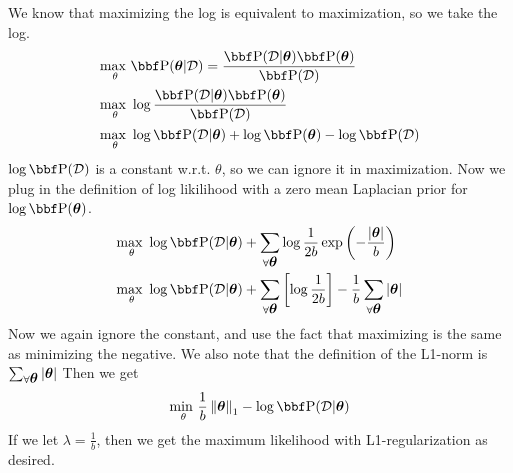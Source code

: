 \documentclass[12pt,letterpaper,fleqn]{hmcpset}
\begin{document}
\vspace{10mm}

We know that maximizing the log is equivalent to maximization, so we take the log.
\begin{align*}
    \underset{\theta}{\text{max }} & \PP(\thetab | \Dc) = \frac{\PP(\Dc | \thetab)\PP(\thetab)}{\PP(\Dc)}\\
    \underset{\theta}{\text{max }} & \log \frac{\PP(\Dc | \thetab)\PP(\thetab)}{\PP(\Dc)} \\
    \underset{\theta}{\text{max }} & \log \PP(\Dc | \thetab) + \log\PP(\thetab) -\log \PP(\Dc)
\end{align*}
$\log \PP(\Dc)$ is a constant w.r.t. $\theta$, so we can ignore it in maximization. Now we plug in the definition of log likilihood with a zero mean Laplacian prior for $\log\PP(\thetab)$.
\begin{align*}
    \underset{\theta}{\text{max }} & \log \PP(\Dc | \thetab) + \sum_{\forall \thetab} \log \frac{1}{2b}\exp \left(-\frac{|\thetab|}{b} \right)\\
    \underset{\theta}{\text{max }} & \log \PP(\Dc | \thetab) + \sum_{\forall \thetab}\left[\log \frac{1}{2b} \right]- \frac{1}{b}\sum_{\forall \thetab}|\thetab|\\
\end{align*}
Now we again ignore the constant, and use the fact that maximizing is the same as minimizing the negative. We also note that the definition of the L1-norm is $\sum_{\forall \hbox{\boldmath$\theta$}}|\hbox{\boldmath$\theta$}|$ Then we get
    $$ \underset{\theta}{\text{min }} \frac{1}{b} \norm{\thetab}_1 - \log \PP(\Dc | \thetab)$$
If we let $\lambda = \frac{1}{b}$, then we get the maximum likelihood with L1-regularization as desired. 
\end{document}
